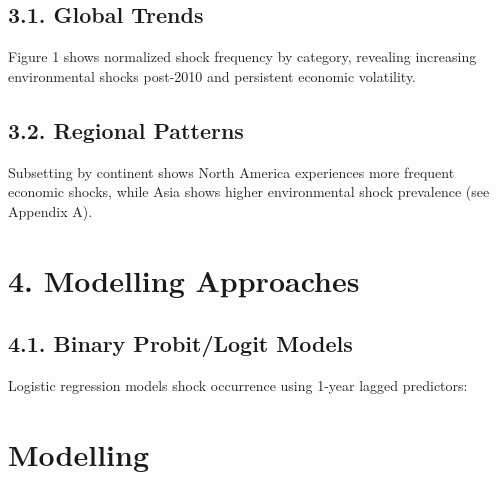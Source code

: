 \documentclass[
]{article}
\begin{document}
\subsection{3.1. Global Trends}\label{global-trends}

Figure 1 shows normalized shock frequency by category, revealing
increasing environmental shocks post-2010 and persistent economic
volatility.

\subsection{3.2. Regional Patterns}\label{regional-patterns}

Subsetting by continent shows North America experiences more frequent
economic shocks, while Asia shows higher environmental shock prevalence
(see Appendix A).

\section{4. Modelling Approaches}\label{modelling-approaches}

\subsection{4.1. Binary Probit/Logit
Models}\label{binary-probitlogit-models}

Logistic regression models shock occurrence using 1-year lagged
predictors:

\section{Modelling}\label{modelling}
\end{document}
